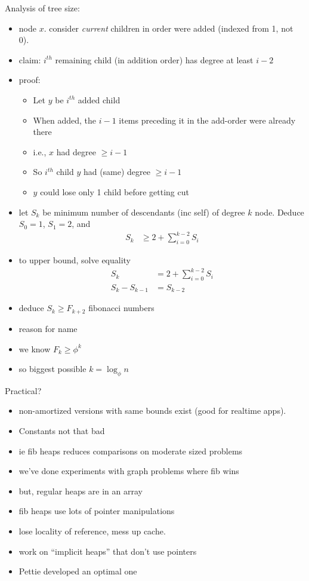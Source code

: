 \documentclass{article}
\begin{document}
Analysis of tree size:
\begin{itemize}
\item node $x$.  consider \emph{current} children in order were added
  (indexed from 1, not 0).
\item claim: $i^{th}$ remaining child (in addition order) has degree at
least $i-2$
\item proof: 
\begin{itemize}
\item Let $y$ be $i^{th}$ added child
\item When added, the $i-1$ items preceding it in the add-order were
  already there
\item i.e., $x$ had degree  $\ge i-1$
\item So $i^{th}$ child $y$ had (same) degree $\ge  i-1$
\item $y$ could lose only 1 child before getting cut
\end{itemize}
\item let $S_k$ be minimum number of descendants (inc self) of degree
  $k$ node.  Deduce $S_0 =1$, $S_1=2$, and
\begin{align*}
S_k &\ge 2+ \sum_{i=0}^{k-2} S_i
\end{align*}
\item to upper bound, solve equality
\begin{align*}
S_k &= 2+\sum_{i=0}^{k-2} S_i\\
S_k - S_{k-1} &= S_{k-2}
\end{align*}
\item deduce $S_k \ge F_{k+2}$ fibonacci numbers
\item reason for name
\item we know $F_k \ge \phi^k$
\item so biggest possible $k=\log_\phi n$
\end{itemize}

Practical?
\begin{itemize}
\item non-amortized versions with same bounds exist (good for realtime
  apps).
\item Constants not that bad
\item ie fib heaps reduces comparisons on moderate sized problems
\item we've done experiments with graph problems where fib wins
\item but, regular heaps are in an array
\item fib heaps use lots of pointer manipulations
\item lose locality of reference, mess up cache.
\item work on ``implicit heaps'' that don't use pointers
\item Pettie developed an optimal one
\end{itemize}
\end{document}
